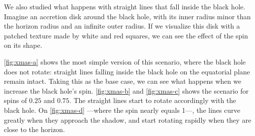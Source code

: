 We also studied what happens with straight lines that fall inside the black hole. Imagine an accretion disk around the black hole, with its inner radius minor than the horizon radius and an infinite outer radius. If we visualize this disk with a patched texture made by white and red squares, we can see the effect of the spin on its shape.

\autoref{fig:xmas-a} shows the most simple version of this scenario, where the black hole does not rotate: straight lines falling inside the black hole on the equatorial plane remain intact. Taking this as the base case, we can see what happens when we increase the black hole's spin. \autoref{fig:xmas-b} and \autoref{fig:xmas-c} shows the scenario for spins of $0.25$ and $0.75$. The straight lines start to rotate accordingly with the black hole. On \autoref{fig:xmas-d} ---where the spin nearly equals 1---, the lines curve greatly when they approach the shadow, and start rotating rapidly when they are close to the horizon.

